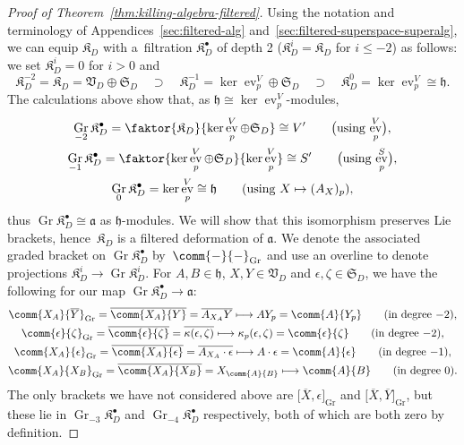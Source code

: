 \documentclass[10pt,a4paper]{amsart}
\numberwithin{equation}{section}
\newcommand{\fa}{\mathfrak{a}}
\newcommand{\fh}{\mathfrak{h}}
\newcommand{\fK}{\mathfrak{K}}
\newcommand{\fS}{\mathfrak{S}}
\newcommand{\fV}{\mathfrak{V}}
\newcommand{\1}{\mathbbm{1}}
\DeclareMathOperator{\Gr}{Gr}
\DeclareMathOperator{\evaluate}{ev}
\begin{document}
\begin{proof}[Proof of Theorem~\ref{thm:killing-algebra-filtered}]
	Using the notation and terminology of Appendices~\ref{sec:filtered-alg} and~\ref{sec:filtered-superspace-superalg}, we can equip $\fK_D$ with a~filtration $\fK_D^\bullet$ of depth 2 ($\fK_D^i = \fK_D$ for $i\leq-2$) as follows: we set $\fK_D^i = 0$ for $i>0$ and
	\[
		\fK_D^{-2}=\fK_D = \fV_D\oplus\fS_D \quad \supset \quad
		\fK_D^{-1} = \ker\evaluate^V_p\oplus \fS_D \quad \supset \quad
		\fK_D^0 = \ker\evaluate^V_p\cong \fh.
	\]
	The calculations above show that, as $\fh\cong\ker\evaluate^V_p$-modules,
	\begin{gather*}
		\Gr_{-2}\fK_D^\bullet = \faktor{\fK_D}{\ker\evaluate^V_p\oplus\fS_D} \cong V' \qquad \text{\big(using $\evaluate^V_p$\big)},	\\
		\Gr_{-1}\fK_D^\bullet = \faktor{\ker\evaluate^V_p\oplus\fS_D}{\ker\evaluate^V_p} \cong S'	\qquad \text{\big(using $\evaluate^{S}_p$\big)},	\\
		\Gr_0 \fK_D^\bullet = \ker\evaluate^V_p \cong \fh \qquad\text{(using $X\mapsto (A_X)_p$)},
	\end{gather*}
	thus $\Gr\fK_D^\bullet\cong\fa$ as $\fh$-modules. We will show that this isomorphism preserves Lie brackets, hence~$\fK_D$ is a filtered deformation of $\fa$. We denote the associated graded bracket on $\Gr\fK_D^\bullet$ by~$\comm{-}{-}_{\mathrm{Gr}}$ and use an overline to denote projections $\fK_D^i\to\Gr\fK_D^i$. For $A,B\in\fh$, $X,Y\in\fV_D$ and $\epsilon,\zeta\in\fS_D$, we have the following for our map $\Gr\fK_D^\bullet\to\fa$:
	\begin{gather*}
		\comm{X_A}{\overline{Y}}_{\mathrm{Gr}} = \overline{\comm{X_A}{Y}} = \overline{A_{X_A}Y}
			 \longmapsto 	 A Y_p = \comm{A}{Y_p}	\qquad (\text{in degree $-2$}),	\\
		\comm{\epsilon}{\zeta}_{\mathrm{Gr}} = \overline{\comm{\epsilon}{\zeta}} = \overline{\kappa(\epsilon,\zeta)}
			 \longmapsto 	 \kappa_p(\epsilon,\zeta) = \comm{\epsilon}{\zeta}	\qquad (\text{in degree $-2$}),	\\
		\comm{X_A}{\epsilon}_{\mathrm{Gr}} = \overline{\comm{X_A}{\epsilon}} = \overline{A_{X_A}\cdot\epsilon}
			 \longmapsto 	 A\cdot \epsilon = \comm{A}{\epsilon}	\qquad (\text{in degree $-1$}),	\\
		\comm{X_A}{X_B}_{\mathrm{Gr}} = \overline{\comm{X_A}{X_B}} = X_{\comm{A}{B}}
		 \longmapsto 	 \comm{A}{B}	\qquad (\text{in degree $0$}).
	\end{gather*}
	The only brackets we have not considered above are $\big[\overline{X},\epsilon\big]_{\mathrm{Gr}}$ and $\big[\overline{X},\overline{Y}\big]_{\mathrm{Gr}}$, but these lie in $\Gr_{-3}\fK_D^\bullet$ and $\Gr_{-4}\fK_D^\bullet$ respectively, both of which are both zero by definition.
	\end{proof}
	
\end{document}
